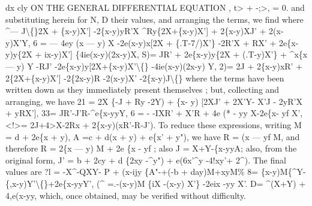 \documentclass[12pt,a4paper]{article}
\begin{document}
dx
cly
ON THE GENERAL DIFFERENTIAL EQUATION
, t> + -;>, = 0.
and substituting herein
for N, D
their
values, and arranging the
terms, we
find
where
\textasciicircum{}--- J\textbackslash\{\}2X + \{x-y)X']
-2\{x-y)yR'X
\textasciicircum{}Ry\{2X+\{x-y)X']
+ 2\{x-y)XJ'
+ 2(x-y)X'Y,
6 = --- 4ey (x --- y) X
-2e(x-y)x[2X + \{.T-7/)X'\}
-2R'X
+ RX'
+ 2e\{x-y)y\{2X + ix-y)X']
\{4ie(x-y)(2x-y)X,
S)=
JR'
+ 2e\{x-y)y\{2X + (.T-y)X'\}
+ \textasciicircum{}x\{x --- y) Y
-RJ'
-2e\{x-y)y[2X+\{x-y)X'\textbackslash\{\}
-4ie(x-y)(2x-y) Y,
2)=
2J
+ 2\{x-y)xR'
+ 2\{2X+\{x-y)X']
-2\{2x-y)R
-2(x-y)X'
-2\{x-y)J\textbackslash\{\}
where the terms
have
been
written
down
as they immediately present themselves
;
but,
collecting and arranging, we have
21 =
2X \{-J + Ry -2Y) + \{x- y) [2XJ' + 2X'Y- X'J - 2yR'X + yRX'],
33=
JR'-J'R-\textasciicircum{}e\{x-yyY,
6 = - -IXR' + X'R + 4e (*\textbullet{} - yy X-2e\{x- yf X',
<!>=
2J+4>X-2Rx + 2\{x-y)(xR'-R-J').
To reduce these expressions, writing
M = d + 2e\{x + y),
A =c +
d(x + y) + e\{x' + y"),
we have R = (x --- yf M, and
therefore R = 2\{x --- y) M + 2e \{x - yf
;
also
J = X+Y-\{x-yyA;
also, from the
original
form,
J' = b + 2cy + d \{2xy -\textasciicircum{}y") + e(6x'\textasciicircum{}y -4!xy'+ 2\textasciicircum{}).
The
final values are
?l =
-X\textasciicircum{}-QXY- P + (x-ijy \{A"-+(-b + day)M+xyM\%
8=
\{x-y)M\{\textasciicircum{}Y-\textyen{}\{,x-y)Y'\textbackslash\{\}+2e\{x-yyY',
(\textasciicircum{} =.-(x-y)M \{iX -(x-y) X'\} -2eix -yy X'.
D=
\textasciicircum{}(X+Y) + 4,e(x-yy,
which, once obtained, may be
verified without
difficulty.
\end{document}
